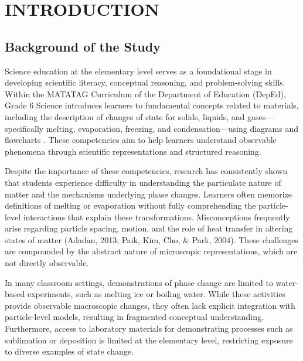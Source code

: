 \chapter{INTRODUCTION}

\section{Background of the Study}

Science education at the elementary level serves as a foundational stage in developing scientific literacy, conceptual reasoning, and problem-solving skills. Within the MATATAG Curriculum of the Department of Education (DepEd), Grade 6 Science introduces learners to fundamental concepts related to materials, including the description of changes of state for solids, liquids, and gases---specifically melting, evaporation, freezing, and condensation---using diagrams and flowcharts \cite{Kilag2024}. These competencies aim to help learners understand observable phenomena through scientific representations and structured reasoning.

Despite the importance of these competencies, research has consistently shown that students experience difficulty in understanding the particulate nature of matter and the mechanisms underlying phase changes. Learners often memorize definitions of melting or evaporation without fully comprehending the particle-level interactions that explain these transformations. Misconceptions frequently arise regarding particle spacing, motion, and the role of heat transfer in altering states of matter (Adadan, 2013; Paik, Kim, Cho, \& Park, 2004). These challenges are compounded by the abstract nature of microscopic representations, which are not directly observable.

In many classroom settings, demonstrations of phase change are limited to water-based experiments, such as melting ice or boiling water. While these activities provide observable macroscopic changes, they often lack explicit integration with particle-level models, resulting in fragmented conceptual understanding. Furthermore, access to laboratory materials for demonstrating processes such as sublimation or deposition is limited at the elementary level, restricting exposure to diverse examples of state change.

